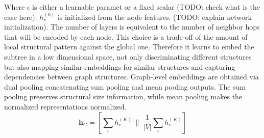 \documentclass[11pt, a4paper]{article}
\begin{document}
\begin{itemize}[leftmargin=*]
  Where $\epsilon$ is either a learnable paramet or a fixed scalar (TODO: check what is the case here).
  $h_v^{(0)}$ is initialized from the node features. (TODO: explain network initialization).
  The number of layers is equivalent to the number of neighbor hops that will be encoded by each node.
  This choice is a trade-off of the amount of local structural pattern against the global one.  
  Therefore it learns to embed the subtree in a low dimensional space, not only discriminating different structures but also mapping similar embeddings for similar structures and capturing dependencies between graph structures.
  Graph-level embeddings are obtained via dual pooling concatenating sum pooling and mean pooling outputs. 
  The sum pooling preserves structural size information, while mean pooling makes the normalized representations normalized.
  $$\mathbf{h}_G = \left[\sum_{v} h_v^{(K)}\ \Big\|\ \frac{1}{|V|}\sum_{v} h_v^{(K)}\right]$$   
    \vspace{0.2cm}
    \begin{figure}[h!]
      \centering
      \begin{minipage}{0.48\textwidth}
\end{minipage}
\end{figure}
\end{itemize}
\end{document}

